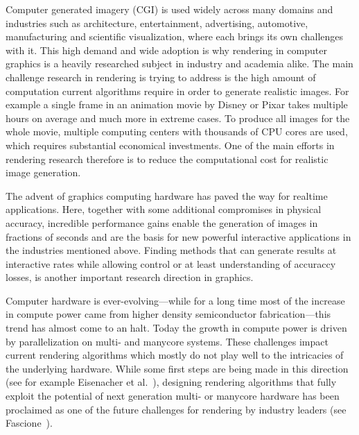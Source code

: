 Computer generated imagery (CGI) is used widely across many domains and industries such as architecture, entertainment, advertising, automotive, manufacturing and scientific visualization, where each brings its own challenges with it. This high demand and wide adoption is why rendering in computer graphics is a heavily researched subject in industry and academia alike. The main challenge research in rendering is trying to address is the high amount of computation current algorithms require in order to generate realistic images. For example a single frame in an animation movie by Disney or Pixar takes multiple hours on average and much more in extreme cases. To produce all images for the whole movie, multiple computing centers with thousands of CPU cores are used, which requires substantial economical investments. One of the main efforts in rendering research therefore is to reduce the computational cost for realistic image generation.

The advent of graphics computing hardware has paved the way for realtime applications. Here, together with some additional compromises in physical accuracy, incredible performance gains enable the generation of images in fractions of seconds and are the basis for new powerful interactive applications in the industries mentioned above. Finding methods that can generate results at interactive rates while allowing control or at least understanding of accuraccy losses, is another important research direction in graphics.

Computer hardware is ever-evolving---while for a long time most of the increase in compute power came from higher density semiconductor fabrication---this trend has almost come to an halt. Today the growth in compute power is driven by parallelization on multi- and manycore systems. These challenges impact current rendering algorithms which mostly do not play well to the intricacies of the underlying hardware. While some first steps are being made in this direction (see for example Eisenacher et al.~\cite{Eisenacher13}), designing rendering algorithms that fully exploit the potential of next generation multi- or manycore hardware has been proclaimed as one of the future challenges for rendering by industry leaders (see Fascione~\cite{Fascione15}).

